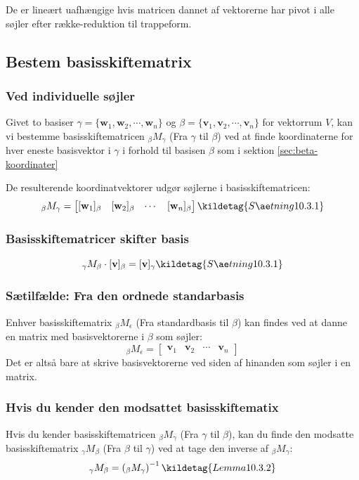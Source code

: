 De er lineært uafhængige hvis matricen dannet af vektorerne har pivot i alle søjler efter række-reduktion til trappeform.

\subsection{Bestem basisskiftematrix}
\subsubsection{Ved individuelle søjler}
Givet to basiser
$\gamma = \{\mathbf{w}_1, \mathbf{w}_2, \cdots, \mathbf{w}_n\}$ og $\beta = \{\mathbf{v}_1, \mathbf{v}_2, \cdots, \mathbf{v}_n\}$
for vektorrum $V$, kan vi bestemme basisskiftematricen $_\beta M _\gamma$ (Fra $\gamma$ til $\beta$) 
ved at finde koordinaterne for hver eneste basisvektor i $\gamma$ i forhold til basisen $\beta$ som i sektion \ref{sec:beta-koordinater}

De resulterende koordinatvektorer udgør søjlerne i basisskiftematricen:
\[_\beta M_\gamma = \begin{bmatrix} [\mathbf{w}_1]_\beta & [\mathbf{w}_2]_\beta & \cdots & [\mathbf{w}_n]_\beta \end{bmatrix} \kildetag{Sætning 10.3.1} \]

\subsubsection{Basisskiftematricer skifter basis}
\[_\gamma M_\beta \cdot [\mathbf{v}]_\beta = [\mathbf{v}]_\gamma \kildetag{Sætning 10.3.1}\]

\subsubsection{Sætilfælde: Fra den ordnede standarbasis}
Enhver basisskiftematrix $_\beta M _\epsilon$ (Fra standardbasis til $\beta$) kan findes ved at danne en matrix med basisvektorerne i $\beta$ som søjler:
\[_\beta M_\epsilon = \begin{bmatrix} \mathbf{v}_1 & \mathbf{v}_2 & \cdots & \mathbf{v}_n \end{bmatrix}\]
Det er altså bare at skrive basisvektorerne ved siden af hinanden som søjler i en matrix.

\subsubsection{Hvis du kender den modsattet basisskiftematix}
Hvis du kender basisskiftematricen $_\beta M _\gamma$ (Fra $\gamma$ til $\beta$), kan du finde den modsatte basisskiftematrix $_\gamma M _\beta$ (Fra $\beta$ til $\gamma$) ved at tage den inverse af $_\beta M _\gamma$:
\[_\gamma M _\beta = \left(_\beta M _\gamma\right)^{-1} \kildetag{Lemma 10.3.2}\]

